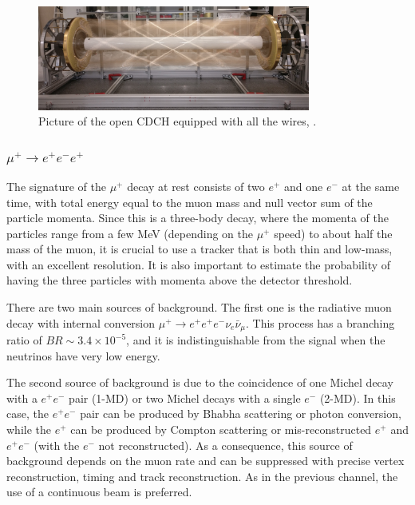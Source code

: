 \begin{figure}[!h]
\centering
\includegraphics[width =0.8\textwidth]{figures/png/Screenshot_20240307_140235.png}
\caption[MEG II detector (II).]{Picture of the open CDCH equipped with all the wires, \cite{megiicollaboration2024operation}.}
\label{fig:meg2}
\end{figure}






\subsubsection{$\mu^+ \rightarrow e^+ e^-  e^+ $}
The signature of the $\mu^+$ decay at rest consists of two $e^+$ and one $e^-$ at the same time, 
with total energy equal to the muon mass and null vector sum of the
particle momenta.
Since this is a three-body decay, where the momenta of the particles 
range from a few MeV (depending on the $\mu^+$ speed) to about half the mass of the muon, it is crucial 
to use a tracker that is both thin and low-mass, with an excellent resolution. 
It is also important to estimate the probability
of having the three particles with momenta above the detector threshold.

There are two main sources of background. The first one is the radiative muon decay with 
internal conversion $\mu^+ \rightarrow e^+ e^+ e^- \nu_e \bar{\nu}_\mu$. 
This process has a branching ratio of $BR\sim 3.4 \times 10^{-5}$, and it is 
indistinguishable from the signal when the neutrinos have very low energy. 

The second source of background is due to the coincidence 
of one Michel decay with a $e^+e^-$ pair (1-MD) or two Michel decays with a single $e^-$ (2-MD). 
In this case, the $e^+e^-$ pair can be produced by Bhabha scattering or photon conversion, while the $e^+$
can be produced by Compton scattering or mis-reconstructed $e^+$ and $e^+e^-$ (with the $e^-$ not reconstructed). 
As a consequence, this source of background depends on the muon rate and
can be suppressed with precise vertex reconstruction, timing and track reconstruction.
As in the previous channel, the use of a continuous beam is preferred.


